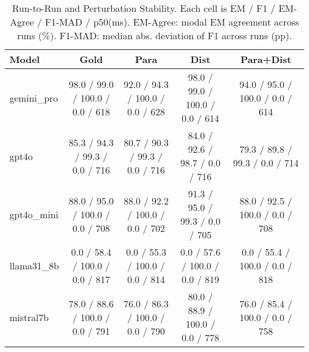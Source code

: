 \begin{table}[t]\centering
\caption{Run-to-Run and Perturbation Stability. Each cell is EM / F1 / EM-Agree / F1-MAD / p50(ms). EM-Agree: modal EM agreement across runs (\%). F1-MAD: median abs. deviation of F1 across runs (pp).}
\label{tab:stability}
\small
\setlength{\tabcolsep}{4pt}
\renewcommand{\arraystretch}{1.05}
\begin{tabular}{lcccc}
\toprule
Model & Gold & Para & Dist & Para+Dist \\
\midrule
gemini_pro & 98.0 / 99.0 / 100.0 / 0.0 / 618 & 92.0 / 94.3 / 100.0 / 0.0 / 628 & 98.0 / 99.0 / 100.0 / 0.0 / 614 & 94.0 / 95.0 / 100.0 / 0.0 / 614 \\
gpt4o & 85.3 / 94.3 / 99.3 / 0.0 / 716 & 80.7 / 90.3 / 99.3 / 0.0 / 716 & 84.0 / 92.6 / 98.7 / 0.0 / 716 & 79.3 / 89.8 / 99.3 / 0.0 / 714 \\
gpt4o_mini & 88.0 / 95.0 / 100.0 / 0.0 / 708 & 88.0 / 92.2 / 100.0 / 0.0 / 702 & 91.3 / 95.0 / 99.3 / 0.0 / 705 & 88.0 / 92.5 / 100.0 / 0.0 / 708 \\
llama31_8b & 0.0 / 58.4 / 100.0 / 0.0 / 817 & 0.0 / 55.3 / 100.0 / 0.0 / 814 & 0.0 / 57.6 / 100.0 / 0.0 / 819 & 0.0 / 55.4 / 100.0 / 0.0 / 818 \\
mistral7b & 78.0 / 88.6 / 100.0 / 0.0 / 791 & 76.0 / 86.3 / 100.0 / 0.0 / 790 & 80.0 / 88.9 / 100.0 / 0.0 / 778 & 76.0 / 85.4 / 100.0 / 0.0 / 758 \\
\bottomrule
\end{tabular}
\end{table}
